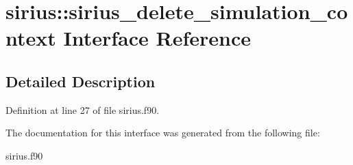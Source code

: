 \hypertarget{interfacesirius_1_1sirius__delete__simulation__context}{}\section{sirius\+:\+:sirius\+\_\+delete\+\_\+simulation\+\_\+context Interface Reference}
\label{interfacesirius_1_1sirius__delete__simulation__context}


\subsection{Detailed Description}


Definition at line 27 of file sirius.\+f90.



The documentation for this interface was generated from the following file\+:\begin{DoxyCompactItemize}
\item 
sirius.\+f90\end{DoxyCompactItemize}
